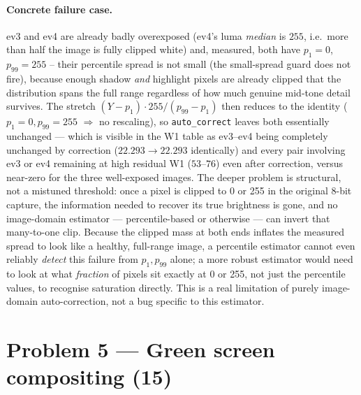 \documentclass[11pt]{article}
\begin{document}
\paragraph{Concrete failure case.} ev3 and ev4 are already badly overexposed (ev4's luma
\emph{median} is $255$, i.e.\ more than half the image is fully clipped white) and, measured,
both have $p_1=0$, $p_{99}=255$ -- their percentile spread is not small (the small-spread guard
does not fire), because enough shadow \emph{and} highlight pixels are already clipped that the
distribution spans the full range regardless of how much genuine mid-tone detail survives. The
stretch $(Y-p_1)\cdot255/(p_{99}-p_1)$ then reduces to the identity ($p_1=0,p_{99}=255$
$\Rightarrow$ no rescaling), so \texttt{auto\_correct} leaves both essentially unchanged --- which
is visible in the W1 table as ev3--ev4 being completely unchanged by correction ($22.293\to
22.293$ identically) and every pair involving ev3 or ev4 remaining at high residual W1
($53$--$76$) even after correction, versus near-zero for the three well-exposed images. The
deeper problem is structural, not a mistuned threshold: once a pixel is clipped to 0 or 255 in
the original 8-bit capture, the information needed to recover its true brightness is gone, and no
image-domain estimator --- percentile-based or otherwise --- can invert that many-to-one clip.
Because the clipped mass at both ends inflates the measured spread to look like a healthy,
full-range image, a percentile estimator cannot even reliably \emph{detect} this failure from
$p_1,p_{99}$ alone; a more robust estimator would need to look at what \emph{fraction} of pixels
sit exactly at 0 or 255, not just the percentile values, to recognise saturation directly. This is
a real limitation of purely image-domain auto-correction, not a bug specific to this estimator.

\section{Problem 5 --- Green screen compositing (15)}
\end{document}
